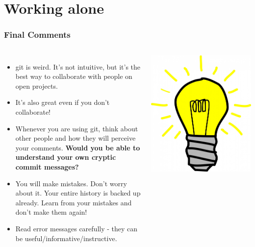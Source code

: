 \documentclass{beamer}
\begin{document}
\section{Working alone}

\begin{frame}
\frametitle{Final Comments}
\begin{columns}
\begin{itemize}
\item git is weird. It's not intuitive, but it's the best way to collaborate with people on open projects.
\item It's also great even if you don't collaborate!
\item Whenever you are using git, think about other people and how they will perceive your comments. \textbf{Would you be able to understand your own cryptic commit messages?}
\item You will make mistakes. Don't worry about it. Your entire history is backed up already. Learn from your mistakes and don't make them again!
\item Read error messages carefully - they can be useful/informative/instructive.
\end{itemize}
\includegraphics[width=\textwidth]{light-bulb.jpg}
\end{columns}
\end{frame}
\end{document}

